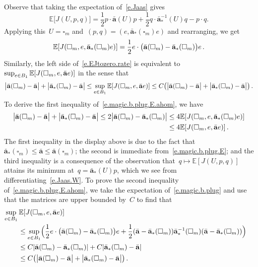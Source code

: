 \documentclass[11pt,twoside]{article} %
\let\oldsquare\square %
\renewcommand{\square}{\oldsquare}
\numberwithin{equation}{section}
\theoremstyle{definition}
\let\originalleft\left
\let\originalright\right
\renewcommand{\left}{\mathopen{}\mathclose\bgroup\originalleft}
\renewcommand{\right}{\aftergroup\egroup\originalright}
\renewcommand{\a}{\mathbf{a}}
\newcommand{\ahom}{\bar{\a}}
\newcommand{\cu}{\square}
\newcommand{\E}{\mathbb{E}}
\begin{document}
Observe that taking the expectation of~\eqref{e.Jaas} gives
\begin{equation}
\label{e.Jaas.W}
\E \bigl[ J(U,p,q) \bigr] 
=
\frac12p\cdot \ahom(U) p + \frac12 q\cdot \ahom_*^{-1}(U)q - p\cdot q. 
\end{equation}
Applying this~$U=\cu_m$ and~$(p,q) = (e, \ahom_*(\cu_m)e)$ and rearranging, we get 
\begin{equation}
\label{e.magic.b.plug.E}
\E \left[ J(\cu_m,e,\ahom_*(\cu_m) e) \right]
=\frac12 e \cdot \bigl( \ahom(\cu_m) - \ahom_*(\cu_m) \bigr) e
\,. 
\end{equation}
Similarly, the left side of~\eqref{e.EJtozero.rate} is equivalent to~$\sup_{e\in B_1}
\E \left[ J(\cu_m,e,\ahom e) \right]$ in the sense that 
\begin{equation}
\label{e.magic.b.plug.E.ahom}
\bigl| \ahom(\cu_m) - \ahom \bigr|
+
\bigl| \ahom_*(\cu_m) - \ahom \bigr|
\leq
\sup_{e\in B_1}
\E \left[ J(\cu_m,e,\ahom e) \right]
\leq 
C\bigl( \bigl| \ahom(\cu_m) - \ahom \bigr|
+
\bigl| \ahom_*(\cu_m) - \ahom \bigr|\bigr) 
\,.
\end{equation}
To derive the first inequality of~\eqref{e.magic.b.plug.E.ahom}, we have
\begin{align}
\label{e.magic.b.plug.E.ahom.pre}
\bigl| \ahom(\cu_m) - \ahom \bigr|
+
\bigl| \ahom_*(\cu_m) - \ahom \bigr|
\leq 
2 \bigl| \ahom(\cu_m) - \ahom_*(\cu_m) \bigr|
&
\leq
4 \E \left[ J(\cu_m,e,\ahom_*(\cu_m) e) \right]
\notag \\ & 
\leq
4 \E \left[ J(\cu_m,e,\ahom e) \right]
\,.
\end{align}
The first inequality in the display above is due to the fact that~$\ahom_*(\cu_m)\leq \ahom \leq \ahom(\cu_m)$; the second is immediate from~\eqref{e.magic.b.plug.E}; and the third inequality is a consequence of the observation that~$q \mapsto \E [ J(U,p,q)]$ attains its minimum at~$q = \ahom_*(U)p$, which we see from differentiating~\eqref{e.Jaas.W}.  
To prove the second inequality of~\eqref{e.magic.b.plug.E.ahom}, we take the expectation of~\eqref{e.magic.b.plug} and use that the matrices are upper bounded by~$C$ to find that 
\begin{align*}
\lefteqn{
\sup_{e\in B_1}
\E \left[ J(\cu_m,e,\ahom e) \right]
} \qquad 
\notag \\ & 
\leq
\sup_{e\in B_1}\Bigl( 
\frac12 e \cdot \bigl( \ahom(\cu_m) - \ahom_*(\cu_m) \bigr) e
+
\frac12 (\ahom-\ahom_*(\cu_m))\ahom_*^{-1} (\cu_m)(\ahom-\ahom_*(\cu_m))
\Bigr) 
\notag \\ & 
\leq 
C|\ahom(\cu_m) - \ahom_*(\cu_m) |
+
C| \ahom_*(\cu_m) - \ahom |
\notag \\ & 
\leq 
C\bigl( \bigl| \ahom(\cu_m) - \ahom \bigr|
+
\bigl| \ahom_*(\cu_m) - \ahom \bigr| \bigr)\,.
\end{align*}
\end{document}
